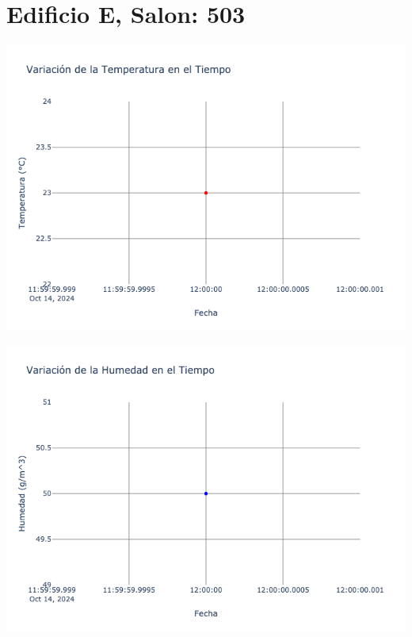 \documentclass{article}
\begin{document}
    \section{Edificio E, Salon: 503}
    \noindent
    \begin{minipage}{0.48\textwidth}
        \centering
        \includegraphics[width=\textwidth]{../img/poli/TS503-90Dias-03-12-2024.png}
    \end{minipage}
    \hfill
    \begin{minipage}{0.48\textwidth}
        \centering
        \includegraphics[width=\textwidth]{../img/poli/HS503-90Dias-03-12-2024.png}
    \end{minipage}
\end{document}
